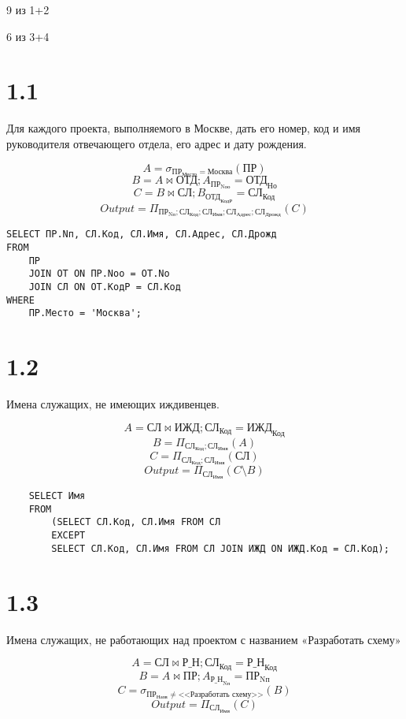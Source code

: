 \documentclass{article}
\newcommand{\employee}{\textbf{СЛ}}
\newcommand{\department}{\textbf{ОТД}}
\newcommand{\project}{\textbf{ПР}}
\newcommand{\dependant}{\textbf{ИЖД}}
\newcommand{\workson}{\textbf{Р\_Н}}
\newcommand{\employeeName}{\textbf{СЛ}_\text{Имя}}
\newcommand{\employeeFirstname}{\textbf{СЛ}_\text{Имя}}
\newcommand{\employeeId}{\textbf{СЛ}_\text{Код}}
\newcommand{\employeeAddress}{\textbf{СЛ}_\text{Адрес}}
\newcommand{\employeeBday}{\textbf{СЛ}_\text{Дрожд}}
\newcommand{\departmentId}{\textbf{ОТД}_\text{Но}}
\newcommand{\departmentBossId}{\textbf{ОТД}_\text{КодР}}
\newcommand{\projectName}{\textbf{ПР}_\text{Назв}}
\newcommand{\projectId}{\textbf{ПР}_\text{Nп}}
\newcommand{\projectPlace}{\textbf{ПР}_\text{Место}}
\newcommand{\projectResponsibleDepId}{\textbf{ПР}_\text{Nоо}}
\newcommand{\dependantEmpId}{\textbf{ИЖД}_\text{Код}}
\newcommand{\worksonEmpId}{\textbf{Р\_Н}_\text{Код}}
\newcommand{\worksonProjId}{\textbf{Р\_Н}_\text{Nп}}
\begin{document}
9 из 1+2

6 из 3+4

\section{1.1}

Для каждого проекта, выполняемого в Москве, дать его номер, код и имя руководителя отвечающего отдела, его адрес и дату рождения.

$$A = \sigma{}_{\projectPlace = \text{Москва}}(\project{})$$
$$B = A \bowtie \department{}; A_{\projectResponsibleDepId} = \departmentId$$
$$C = B \bowtie \employee{}; B_{\departmentBossId} = \employeeId $$
$$Output = \Pi_{\projectId; \employeeId; \employeeFirstname; \employeeAddress; \employeeBday}(C)$$

\begin{verbatim}
SELECT ПР.Nп, СЛ.Код, СЛ.Имя, СЛ.Адрес, СЛ.Дрожд
FROM
    ПР
    JOIN ОТ ON ПР.Nоо = ОТ.Nо
    JOIN СЛ ON ОТ.КодР = СЛ.Код
WHERE
    ПР.Место = 'Москва';
\end{verbatim}

\section{1.2}

Имена служащих, не имеющих иждивенцев.

$$A = \employee \bowtie \dependant; \employeeId = \dependantEmpId$$
$$B = \Pi_{\employeeId; \employeeFirstname}(A)$$
$$C = \Pi_{\employeeId; \employeeFirstname}(\employee)$$
$$Output = \Pi_{\employeeFirstname} (C \setminus B)$$

\begin{verbatim}
    SELECT Имя
    FROM
        (SELECT СЛ.Код, СЛ.Имя FROM СЛ 
        EXCEPT
        SELECT СЛ.Код, СЛ.Имя FROM СЛ JOIN ИЖД ON ИЖД.Код = СЛ.Код);
\end{verbatim}

\section{1.3}

Имена служащих, не работающих над проектом с названием «Разработать схему»

$$A = \employee \bowtie \workson; \employeeId = \worksonEmpId$$
$$B = A \bowtie \project; A_{\worksonProjId} = \projectId$$
$$C = \sigma{}_{\projectName \ne \text{<<Разработать схему>>}}(B)$$
$$Output = \Pi_{\employeeName}(C)$$
\end{document}
